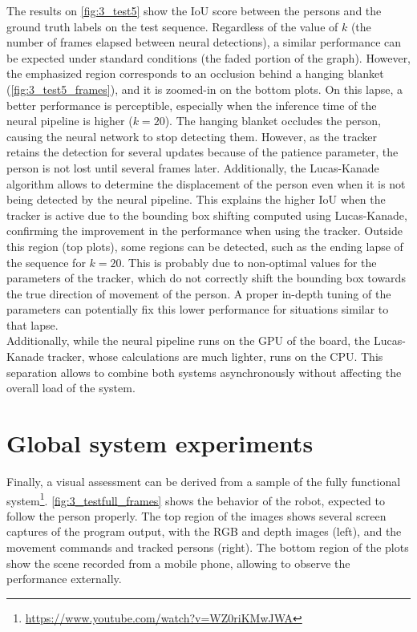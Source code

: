 The results on \autoref{fig:3_test5} show the IoU score between the persons and the ground truth labels on the test sequence. Regardless of the value of $k$ (the number of frames elapsed between neural detections), a similar performance can be expected under standard conditions (the faded portion of the graph). However, the emphasized region corresponds to an occlusion behind a hanging blanket (\autoref{fig:3_test5_frames}), and it is zoomed-in on the bottom plots. On this lapse, a better performance is perceptible, especially when the inference time of the neural pipeline is higher ($k=20$). The hanging blanket occludes the person, causing the neural network to stop detecting them. However, as the tracker retains the detection for several updates because of the patience parameter, the person is not lost until several frames later. Additionally, the Lucas-Kanade algorithm allows to determine the displacement of the person even when it is not being detected by the neural pipeline. This explains the higher IoU when the tracker is active due to the bounding box shifting computed using Lucas-Kanade, confirming the improvement in the performance when using the tracker. Outside this region (top plots), some regions can be detected, such as the ending lapse of the sequence  for $k=20$. This is probably due to non-optimal values for the parameters of the tracker, which do not correctly shift the bounding box towards the true direction of movement of the person. A proper in-depth tuning of the parameters can potentially fix this lower performance for situations similar to that lapse.\\



Additionally, while the neural pipeline runs on the GPU of the board, the Lucas-Kanade tracker, whose calculations are much lighter, runs on the CPU. This separation allows to combine both systems asynchronously without affecting the overall load of the system.



\section{Global system experiments}
\label{sec:4_test_full}
Finally, a visual assessment can be derived from a sample of the fully functional system\footnote{\label{footnote:video_url}\url{https://www.youtube.com/watch?v=WZ0riKMwJWA}}. \autoref{fig:3_testfull_frames} shows the behavior of the robot, expected to follow the person properly. The top region of the images shows several screen captures of the program output, with the RGB and depth images (left), and the movement commands and tracked persons (right). The bottom region of the plots show the scene recorded from a mobile phone, allowing to observe the performance externally.\\

